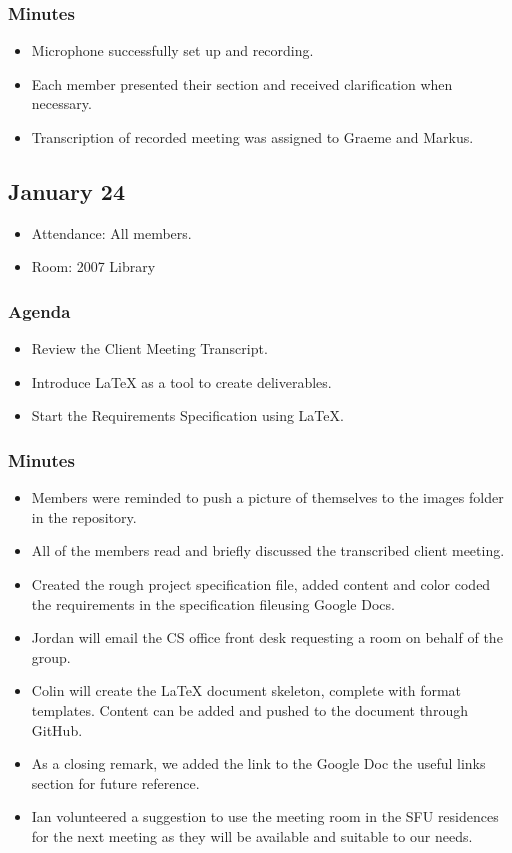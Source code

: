 \documentclass{article}
\begin{document}
\subsubsection{Minutes}
\begin{itemize}
\item Microphone successfully set up and recording.
\item Each member presented their section and received clarification 
when necessary.
\item Transcription of recorded meeting was assigned to Graeme and Markus.
\end{itemize}

\subsection{January 24}
\begin{itemize}
\item Attendance: All members.
\item Room: 2007 Library
\end{itemize}
\subsubsection{Agenda}
\begin{itemize}
\item Review the Client Meeting Transcript.
\item Introduce LaTeX as a tool to create deliverables.
\item Start the Requirements Specification using LaTeX.
\end{itemize}
\subsubsection{Minutes}
\begin{itemize}
\item Members were reminded to push a picture of themselves to the images 
folder in the repository.
\item All of the members read and briefly discussed the transcribed 
client meeting.
\item Created the rough project specification file, added content and color 
coded the requirements in the specification file{using Google Docs}.
\item Jordan will email the CS office front desk requesting a room on behalf
 of the group.
\item Colin will create the LaTeX document skeleton, complete with 
format templates. Content can be added and pushed to
 the document through GitHub.
\item As a closing remark, we added the link to the Google Doc the useful
 links section for future reference. 
\item Ian volunteered a suggestion to use the meeting room in the SFU 
residences for the next meeting as they will be available and 
suitable to our needs.
\end{itemize}
\end{document}
